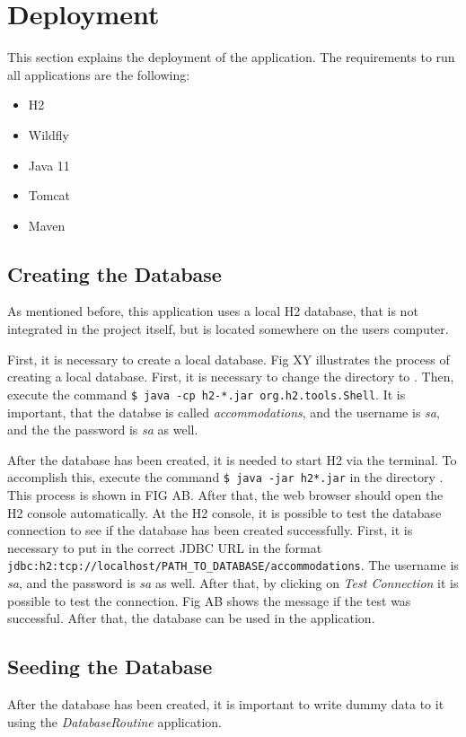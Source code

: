 \section{Deployment}\label{sec:03_depl}
This section explains the deployment of the application.
The requirements to run all applications are the following:
\begin{itemize}
\item H2
\item Wildfly
\item Java 11
\item Tomcat
\item Maven
\end{itemize}


%
\subsection{Creating the Database}
As mentioned before, this application uses a local H2 database, that is not integrated in the project itself, but is located somewhere on the users computer.

First, it is necessary to create a local database. Fig XY illustrates the process of creating a local database. First, it is necessary to change the directory to . Then, execute the command \texttt{\$ java -cp h2-*.jar org.h2.tools.Shell}. It is important, that the databse is called \textit{accommodations}, and the username is \textit{sa}, and the the password is \textit{sa} as well.

After the database has been created, it is needed to start H2 via the terminal. To accomplish this, execute the command \texttt{\$ java -jar h2*.jar} in the directory . This process is shown in FIG AB.
After that, the web browser should open the H2 console automatically. At the H2 console, it is possible to test the database connection to see if the database has been created successfully.
First, it is necessary to put in the correct JDBC URL in the format \texttt{jdbc:h2:tcp://localhost/PATH\_TO\_DATABASE/accommodations}. The username is \textit{sa}, and the password is \textit{sa} as well. After that, by clicking on \textit{Test Connection} it is possible to test the connection. Fig AB shows the message if the test was successful. After that, the database can be used in the application.


\subsection{Seeding the Database}
After the database has been created, it is important to write dummy data to it using the \textit{DatabaseRoutine} application.

